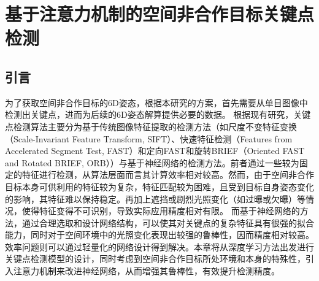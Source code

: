 \chapter{基于注意力机制的空间非合作目标关键点检测}
\section{引言}
为了获取空间非合作目标的6D姿态，根据本研究的方案，首先需要从单目图像中检测出关键点，进而为后续的6D姿态解算提供必要的数据。
根据现有研究，关键点检测算法主要分为基于传统图像特征提取的检测方法（如尺度不变特征变换（Scale-Invariant Feature Transform, SIFT）\citep{sift}、快速特征检测（Features from Accelerated Segment Test, FAST）\citep{fast}和定向FAST和旋转BRIEF（Oriented FAST and Rotated BRIEF, ORB）\citep{orb}）与基于神经网络的检测方法。前者通过一些较为固定的特征进行检测，从算法层面而言其计算效率相对较高。然而，由于空间非合作目标本身可供利用的特征较为复杂，特征匹配较为困难，且受到目标自身姿态变化的影响，其特征难以保持稳定。再加上遮挡或剧烈光照变化（如过曝或欠曝）等情况，使得特征变得不可识别，导致实际应用精度相对有限。
而基于神经网络的方法，通过合理选取和设计网络结构，可以使其对关键点的复杂特征具有很强的拟合能力，同时对于空间环境中的光照变化表现出较强的鲁棒性，因而精度相对较高。效率问题则可以通过轻量化的网络设计得到解决。本章将从深度学习方法出发进行关键点检测模型的设计，同时考虑到空间非合作目标所处环境和本身的特殊性，引入注意力机制来改进神经网络，从而增强其鲁棒性，有效提升检测精度。
